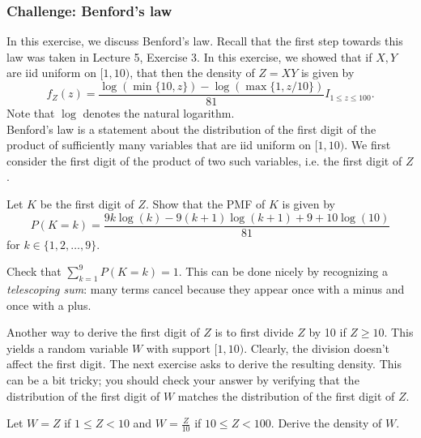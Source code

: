\subsubsection{Challenge: Benford's law}



In this exercise, we discuss Benford's law. Recall that the first step towards this law was taken in Lecture 5, Exercise 3. In this exercise, we showed that if $X,Y$ are iid uniform on $[1, 10)$, that then the density of $Z = XY$ is given by $$f_Z(z) = \frac{\log(\min\{10,z\}) - \log(\max\{1, z/10\})}{81} I_{1 \leq z \leq 100}.$$
Note that $\log$ denotes the natural logarithm. \\
Benford's law is a statement about the distribution of the first digit of the product of sufficiently many variables that are iid uniform on $[1, 10)$. We first consider the first digit of the product of two such variables, i.e. the first digit of $Z$.


\begin{exercise}
Let $K$ be the first digit of $Z$. Show that the PMF of $K$ is given by
$$P(K = k)  = \frac{9k\log(k) - 9(k+1)\log(k+1) + 9+ 10 \log(10)}{81}$$
for $k \in \{1, 2, \ldots, 9\}$.

\end{exercise}


\begin{exercise}
Check that $\sum_{k=1}^9 P(K = k) = 1$. This can be done nicely by recognizing a \textit{telescoping sum}: many terms cancel because they appear once with a minus and once with a plus.
\end{exercise}


Another way to derive the first digit of $Z$ is to first divide $Z$ by 10 if $Z \geq 10$. This yields a random variable $W$ with support $[1, 10)$. Clearly, the division doesn't affect the first digit.  The next exercise asks to derive the resulting density. This can be a bit tricky; you should check your answer by verifying that the distribution of the first digit of $W$ matches the distribution of the first digit of $Z$.

\begin{exercise}
Let $W = Z$ if $1 \leq Z < 10$ and $W = \tfrac{Z}{10}$ if $10 \leq Z < 100$. Derive the density of $W$.
\end{exercise}


